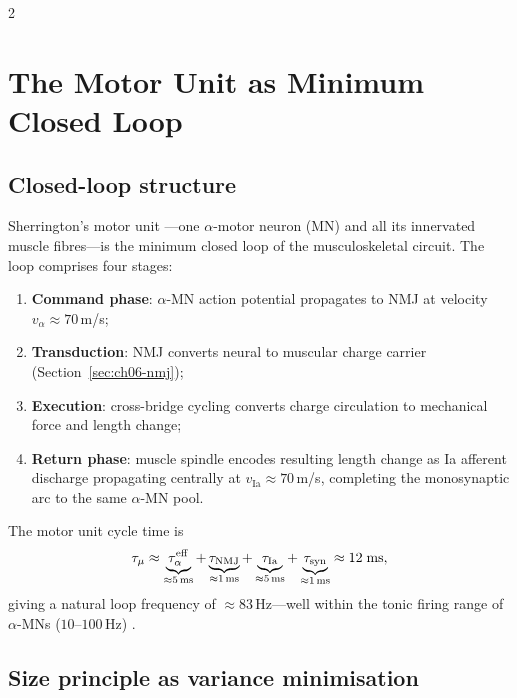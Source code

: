 \begin{multicols}{2}

\section{The Motor Unit as Minimum Closed Loop}
\label{sec:ch06-motorunit}

\subsection{Closed-loop structure}

Sherrington's motor unit \citep{sherrington1925}---one $\alpha$-motor neuron
(MN) and all its innervated muscle fibres---is the minimum closed loop of the
musculoskeletal circuit.  The loop comprises four stages:
\begin{enumerate}[label=(\roman*),itemsep=2pt]
  \item \textbf{Command phase}: $\alpha$-MN action potential propagates to NMJ
        at velocity $v_\alpha \approx 70$\,m/s;
  \item \textbf{Transduction}: NMJ converts neural to muscular charge carrier
        (Section~\ref{sec:ch06-nmj});
  \item \textbf{Execution}: cross-bridge cycling converts charge circulation to
        mechanical force and length change;
  \item \textbf{Return phase}: muscle spindle encodes resulting length change as
        Ia afferent discharge propagating centrally at $v_{\mathrm{Ia}} \approx
        70$\,m/s, completing the monosynaptic arc to the same $\alpha$-MN pool.
\end{enumerate}
The motor unit cycle time is
\begin{equation}
  \tau_{\mu} \approx \underbrace{\tau_{\alpha}^{\mathrm{eff}}}_{\approx 5\,\mathrm{ms}}
               + \underbrace{\tau_{\mathrm{NMJ}}}_{\approx 1\,\mathrm{ms}}
               + \underbrace{\tau_{\mathrm{Ia}}}_{\approx 5\,\mathrm{ms}}
               + \underbrace{\tau_{\mathrm{syn}}}_{\approx 1\,\mathrm{ms}}
               \approx 12\;\mathrm{ms},
  \label{eq:ch06-cycle}
\end{equation}
giving a natural loop frequency of $\approx 83$\,Hz---well within the tonic
firing range of $\alpha$-MNs ($10$--$100$\,Hz) \citep{kandel2013}.

\subsection{Size principle as variance minimisation}


\end{multicols}
